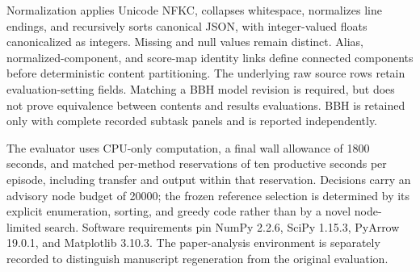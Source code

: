 \documentclass{article}
\begin{document}
Normalization applies Unicode NFKC, collapses whitespace, normalizes line endings, and recursively sorts canonical JSON, with integer-valued floats canonicalized as integers. Missing and null values remain distinct. Alias, normalized-component, and score-map identity links define connected components before deterministic content partitioning. The underlying raw source rows retain evaluation-setting fields. Matching a BBH model revision is required, but does not prove equivalence between contents and results evaluations. BBH is retained only with complete recorded subtask panels and is reported independently.

The evaluator uses CPU-only computation, a final wall allowance of 1800 seconds, and matched per-method reservations of ten productive seconds per episode, including transfer and output within that reservation. Decisions carry an advisory node budget of 20000; the frozen reference selection is determined by its explicit enumeration, sorting, and greedy code rather than by a novel node-limited search. Software requirements pin NumPy 2.2.6, SciPy 1.15.3, PyArrow 19.0.1, and Matplotlib 3.10.3. The paper-analysis environment is separately recorded to distinguish manuscript regeneration from the original evaluation.
\end{document}
